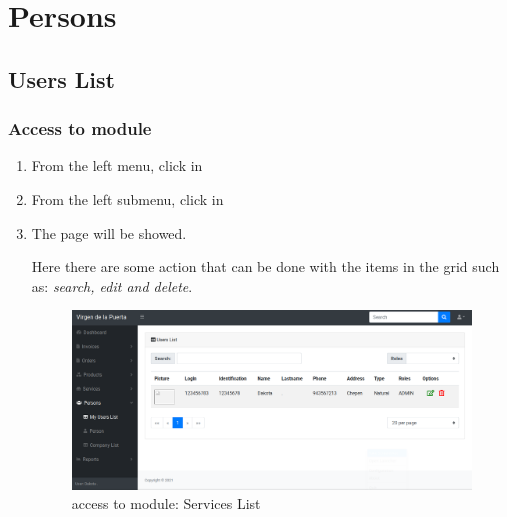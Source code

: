 \documentclass[a4paper,11pt]{refart}
\begin{document}
\section{Persons}
\subsection{Users List}\label{section:user_list}
\subsubsection{Access to module}
\begin{enumerate}
	\item From the left menu, click in  
	\item From the left submenu, click in  
	\item The page will be showed.
	\medskip
	\begin{leftbar}
		Here there are some action that can be done with the items in the grid such as: \emph{search, edit and delete}.
	\end{leftbar}
	\begin{figure}[H]\centering
		\includegraphics[width=\textwidth]{images/user_list-access.png}
		\caption{access to module: Services List}
		\label{fig:user_list-access}
	\end{figure}
\end{enumerate}
\end{document}
